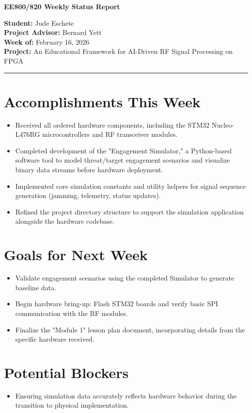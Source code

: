 \documentclass[10pt]{article}
\begin{document}
	
	\begin{center}
		{\Large\textbf{EE800/820 Weekly Status Report}}
	\end{center}
	
	\vspace{0.5em}
	
	\noindent\textbf{Student:} Jude Eschete\\
	\noindent\textbf{Project Advisor:} Bernard Yett\\
	\textbf{Week of:} February 16, 2026\\
	\textbf{Project:} An Educational Framework for AI-Driven RF Signal Processing on FPGA
	
	\vspace{1em}
	\hrule
	\vspace{1em}
	
	\section*{Accomplishments This Week}
	
	\begin{itemize}[noitemsep]
		\item Received all ordered hardware components, including the STM32 Nucleo-L476RG microcontrollers and RF transceiver modules.
		\item Completed development of the "Engagement Simulator," a Python-based software tool to model threat/target engagement scenarios and visualize binary data streams before hardware deployment.
		\item Implemented core simulation constants and utility helpers for signal sequence generation (jamming, telemetry, status updates).
		\item Refined the project directory structure to support the simulation application alongside the hardware codebase.
	\end{itemize}
	
	\section*{Goals for Next Week}
	
	\begin{itemize}[noitemsep]
		\item Validate engagement scenarios using the completed Simulator to generate baseline data.
		\item Begin hardware bring-up: Flash STM32 boards and verify basic SPI communication with the RF modules.
		\item Finalize the "Module 1" lesson plan document, incorporating details from the specific hardware received.
	\end{itemize}
	
	\section*{Potential Blockers}
	
	\begin{itemize}[noitemsep]
		\item Ensuring simulation data accurately reflects hardware behavior during the transition to physical implementation.
	\end{itemize}
	
\end{document}
